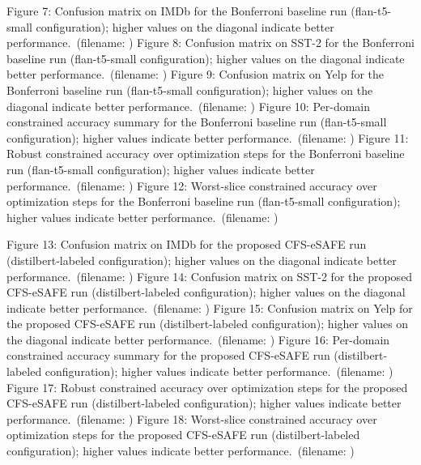 \documentclass{article} %
\begin{document}
Figure 7: Confusion matrix on IMDb for the Bonferroni baseline run (flan-t5-small configuration); higher values on the diagonal indicate better performance.\ (filename: )
Figure 8: Confusion matrix on SST-2 for the Bonferroni baseline run (flan-t5-small configuration); higher values on the diagonal indicate better performance.\ (filename: )
Figure 9: Confusion matrix on Yelp for the Bonferroni baseline run (flan-t5-small configuration); higher values on the diagonal indicate better performance.\ (filename: )
Figure 10: Per-domain constrained accuracy summary for the Bonferroni baseline run (flan-t5-small configuration); higher values indicate better performance.\ (filename: )
Figure 11: Robust constrained accuracy over optimization steps for the Bonferroni baseline run (flan-t5-small configuration); higher values indicate better performance.\ (filename: )
Figure 12: Worst-slice constrained accuracy over optimization steps for the Bonferroni baseline run (flan-t5-small configuration); higher values indicate better performance.\ (filename: )

Figure 13: Confusion matrix on IMDb for the proposed CFS-eSAFE run (distilbert-labeled configuration); higher values on the diagonal indicate better performance.\ (filename: )
Figure 14: Confusion matrix on SST-2 for the proposed CFS-eSAFE run (distilbert-labeled configuration); higher values on the diagonal indicate better performance.\ (filename: )
Figure 15: Confusion matrix on Yelp for the proposed CFS-eSAFE run (distilbert-labeled configuration); higher values on the diagonal indicate better performance.\ (filename: )
Figure 16: Per-domain constrained accuracy summary for the proposed CFS-eSAFE run (distilbert-labeled configuration); higher values indicate better performance.\ (filename: )
Figure 17: Robust constrained accuracy over optimization steps for the proposed CFS-eSAFE run (distilbert-labeled configuration); higher values indicate better performance.\ (filename: )
Figure 18: Worst-slice constrained accuracy over optimization steps for the proposed CFS-eSAFE run (distilbert-labeled configuration); higher values indicate better performance.\ (filename: )
\end{document}
